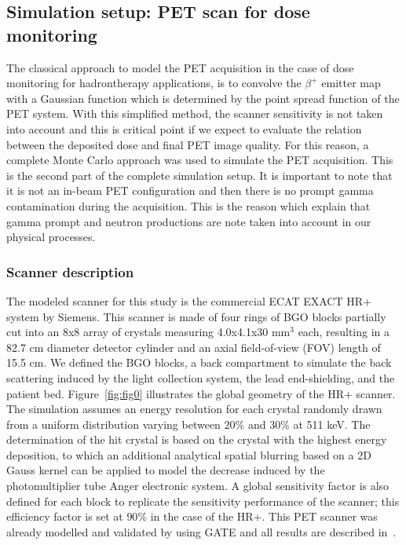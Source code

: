 \documentclass[11pt]{iopart}
\begin{document}


\subsection{Simulation setup: PET scan for dose monitoring}

The classical approach to model the PET acquisition in the case of dose monitoring for hadrontherapy applications, is to convolve the $\beta^{+}$ emitter map with a Gaussian function which is determined by the point spread function of the PET system. With this simplified method, the scanner sensitivity is not taken into account and this is critical point if we expect to evaluate the relation between the deposited dose and final PET image quality. For this reason, a complete Monte Carlo approach was used to simulate the PET acquisition. This is the second part of the complete simulation setup. It is important to note that it is not an in-beam PET configuration and then there is no prompt gamma contamination during the acquisition. This is the reason which explain that gamma prompt and neutron productions are note taken into account in our physical processes.

\subsubsection{Scanner description}

The modeled scanner for this study is the commercial ECAT EXACT
HR+~\cite{Brix1997} system by Siemens. This scanner is made of four
rings of BGO blocks partially cut into an 8x8 array of crystals
measuring 4.0x4.1x30 mm$^3$ each, resulting in a 82.7 cm diameter
detector cylinder and an axial field-of-view (FOV) length of 15.5
cm. We defined the BGO blocks, a back compartment to simulate the back
scattering induced by the light collection system, the lead
end-shielding, and the patient bed. Figure~\ref{fig:fig0} illustrates
the global geometry of the HR+ scanner. The simulation assumes an
energy resolution for each crystal randomly drawn from a uniform
distribution varying between $20 \%$ and $30 \%$ at 511 keV. The
determination of the hit crystal is based on the crystal with the
highest energy deposition, to which an additional analytical spatial
blurring based on a 2D Gauss kernel can be applied to model the
decrease induced by the photomultiplier tube Anger electronic
system. A global sensitivity factor is also defined for each block to
replicate the sensitivity performance of the scanner; this efficiency
factor is set at $90 \%$ in the case of the HR+. This PET scanner was already modelled and
validated by using GATE and all results are described
in~\cite{Jan2005}.
\end{document}
